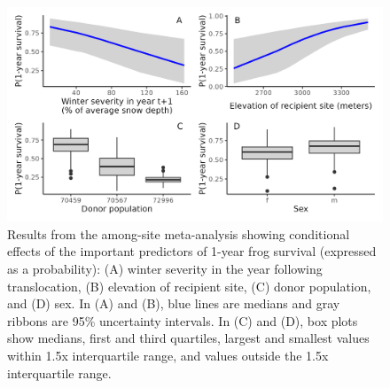 \documentclass[
  letterpaper,
  DIV=11,
  numbers=noendperiod]{scrartcl}
\begin{document}
\begin{figure}

{\centering \includegraphics[width=5.72917in,height=\textheight]{figures/cond_effects_plot.png}

}

\caption{\label{fig-cond-effects}Results from the among-site
meta-analysis showing conditional effects of the important predictors of
1-year frog survival (expressed as a probability): (A) winter severity
in the year following translocation, (B) elevation of recipient site,
(C) donor population, and (D) sex. In (A) and (B), blue lines are
medians and gray ribbons are 95\% uncertainty intervals. In (C) and (D),
box plots show medians, first and third quartiles, largest and smallest
values within 1.5x interquartile range, and values outside the 1.5x
interquartile range.}

\end{figure}

\newpage
\end{document}

